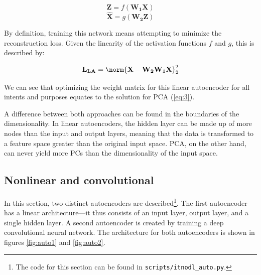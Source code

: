 \begin{equation} \label{eq:4}
	\mathbf{Z} = f(\mathbf{W_1 X})
\end{equation}
\begin{equation}\label{eq:5}
	\mathbf{\hat{X}} = g(\mathbf{W_2 Z})
\end{equation}

By definition, training this network means attempting to minimize the reconstruction loss.  Given the linearity of the activation functions $f$ and $g$, this is described by:

\begin{equation} \label{eq:6}
	\mathbf{L_{LA}} = \norm{\mathbf{X} - \mathbf{W_2 W_1 X}}_2^2 
\end{equation}

We can see that optimizing the weight matrix for this linear autoencoder for all intents and purposes equates to the solution for PCA (\ref{eq:3}).

A difference between both approaches can be found in the boundaries of the dimensionality. In linear autoencoders, the hidden layer can be made up of more nodes than the input and output layers, meaning that the data is transformed to a feature space greater than the original input space. PCA, on the other hand, can never yield more PCs than the dimensionality of the input space.




\subsection{Nonlinear and convolutional}
\label{sec:auto2}

In this section, two distinct autoencoders are described\footnote{The code for this section can be found in \texttt{scripts/itnodl\_auto.py}.}. The first autoencoder has a linear architecture---it thus consists of an input layer, output layer, and a single hidden layer. A second autoencoder is created by training a deep convolutional neural network. The architecture for both autoencoders is shown in figures \ref{fig:auto1} and \ref{fig:auto2}. 

